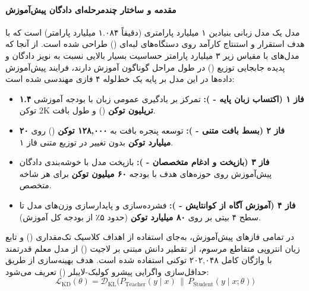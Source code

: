 \item {}

\paragraph*{مقدمه و ساختار چندمرحله‌ای دادگان پیش‌آموزش}
مدل  \cite{huber2025mobilellmpro} یک مدل زبانی بنیادین ۱ میلیارد پارامتری (دقیقاً ۱.۰۸۴ میلیارد پارامتر) است که با هدف استقرار و استنتاج کارآمد روی دستگاه‌های لبه‌ای () طراحی شده است. از آنجا که مدل‌های با مقیاس زیر ۳ میلیارد پارامتر حساسیت بسیار بالایی نسبت به نویز دادگان و پدیده جابجایی توزیع () در طول مراحل گوناگون آموزش دارند، فرایند پیش‌آموزش داده‌ها در این مدل بر پایه یک خط‌لوله ۴ فازی مهندسی شده است:
\begin{itemize}
    \item \textbf{فاز ۱ (اکتساب زبان پایه - ):} تمرکز بر یادگیری عمومی زبان با بودجه آموزشی \textbf{۱.۴ تریلیون توکن} () و طول بافت $2\text{K}$ توکن.
    \item \textbf{فاز ۲ (بسط بافت متنی - ):} توسعه پنجره بافت به \textbf{۱۲۸,۰۰۰ توکن} () روی \textbf{۲۰ میلیارد توکن} بدون تغییر در توزیع متنی فاز ۱.
    \item \textbf{فاز ۳ (بازپخت و ادغام متخصصان - ):} بازپخت مدل با خوشه‌بندی دادگان پیش‌آموزش روی حوزه‌های هدف با بودجه \textbf{۶۰ میلیون توکن} برای هر شاخه متخصص.
    \item \textbf{فاز ۴ (آموزش آگاه از کوانتایش - ):} فشرده‌سازی و پایدارسازی وزن‌های مدل تا سطح ۴ بیتی بر روی \textbf{۸۰ میلیارد توکن} (حدود ۵٪ از بودجه کل آموزش).
\end{itemize}

در تمامی فازهای پیش‌آموزش، به‌جای استفاده از اهداف کلاسیک تک‌مقداری () و تابع زیان انتروپی متقاطع مرسوم، از تقطیر دانش مبتنی بر لاجیت () \cite{hinton2015distilling, jiao2020tinybert} از مدل معلم قدرتمند  با واژگان کامل ۲۰۲,۰۴۸ توکنی استفاده شده است. هدف بهینه‌سازی از طریق حداقل‌سازی واگرایی پیشرو کولبک-لایبلر () تعریف می‌شود:
\begin{equation}
    \mathcal{L}_{\text{KD}}(\theta) = \mathcal{D}_{\text{KL}}\big(P_{\text{Teacher}}(y \mid x) \,\|\, P_{\text{Student}}(y \mid x; \theta)\big)
\end{equation}

